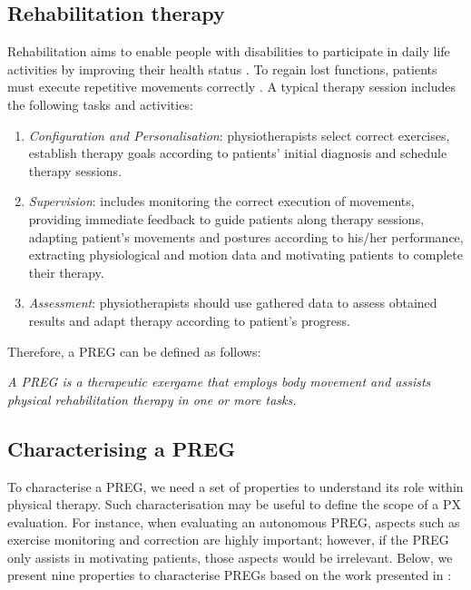 \subsection{Rehabilitation therapy}
\label{sub:def_rehab_therapy}
Rehabilitation aims to enable people with disabilities to participate in daily life activities by improving their health status \autocite{Wiemeyer2015}. To regain lost functions, patients must execute repetitive movements correctly \autocite{PirovanoAdvisor2012}. A typical therapy session includes the following tasks and activities:
\begin{enumerate}
    \item \emph{Configuration and Personalisation}: physiotherapists select correct exercises, establish therapy goals according to patients' initial diagnosis and schedule therapy sessions.
    \item \emph{Supervision}: includes monitoring the correct execution of movements, providing immediate feedback to guide patients along therapy sessions, adapting patient's movements and postures according to his/her performance, extracting physiological and motion data and motivating patients to complete their therapy.
    \item \emph{Assessment}: physiotherapists should use gathered data to assess obtained results and adapt therapy according to patient's progress.
\end{enumerate}

Therefore, a \ac{PREG} can be defined as follows:

\emph{A \ac{PREG} is a therapeutic exergame that employs body movement and assists physical rehabilitation therapy in one or more tasks.}


\subsection{Characterising a \ac{PREG}} %
\label{sec:characterising}
To characterise a \ac{PREG}, we need a set of properties to understand its role within physical therapy. Such characterisation may be useful to define the scope of a \ac{PX} evaluation. For instance, when evaluating an autonomous \ac{PREG}, aspects such as exercise monitoring and correction are highly important; however, if the \ac{PREG} only assists in motivating patients, those aspects would be irrelevant. Below, we present nine properties to characterise \acp{PREG} based on the work presented in \autocite{PirovanoAdvisor2012}:

